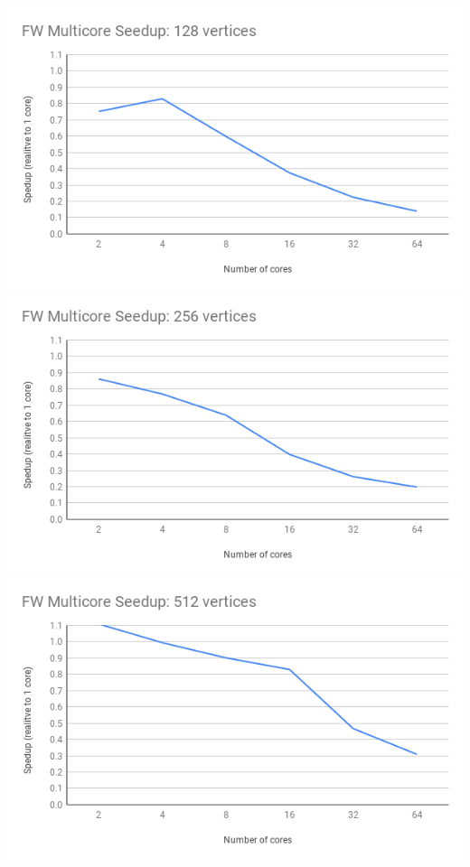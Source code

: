 \documentclass[]{article}
\begin{document}
		\includegraphics[scale=0.5]{graphs/exp2_128.png}\\
		\includegraphics[scale=0.5]{graphs/exp2_256.png}\\
		\includegraphics[scale=0.5]{graphs/exp2_512.png}\\
\end{document}
